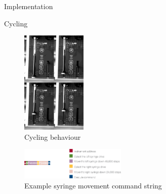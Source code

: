 \documentclass[a0paper,landscape,fontscale=0.32]{baposter}
\begin{document}
\begin{poster}
\begin{posterbox}[name=implementation,column=1,span=2]{Implementation}
\end{posterbox}
\begin{posterbox}[name=cycling,column=1,span=2,below=implementation]{Cycling}
\begin{multicols}{2}
\begin{figure}[H]
    \begin{center}
    \includegraphics[width=0.275\textwidth]{images/combined}
    \end{center}
    \vspace{-1.2em}
  \caption{Cycling behaviour}
\end{figure}
\begin{figure}[H]
    \begin{center}
    \includegraphics[width=0.45\textwidth]{images/examplemanualcommand}
    \end{center}
    \vspace{-1.2em}
  \caption{Example syringe movement command string}
\end{figure}
\end{multicols}
\end{posterbox}


\end{poster}
\end{document}
